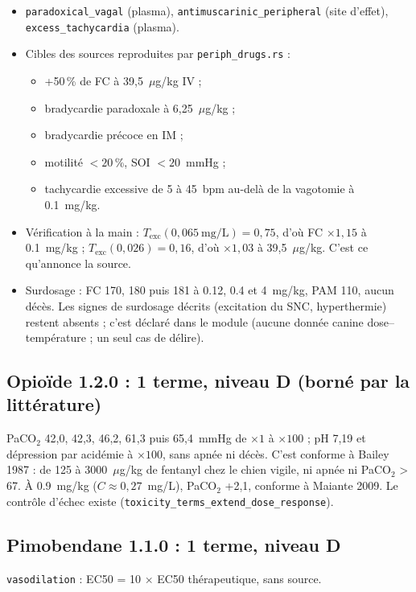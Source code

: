 \documentclass[10pt,a4paper]{article}
\newcommand{\cmd}[1]{\texttt{#1}}
\begin{document}
\begin{itemize}
\item \cmd{paradoxical\_vagal} (plasma), \cmd{antimuscarinic\_peripheral} (site d'effet), \cmd{excess\_tachycardia} (plasma).
\item Cibles des sources reproduites par \cmd{periph\_drugs.rs} :
  \begin{itemize}
  \item +50\,\% de FC à 39,5~$\mu$g/kg IV ;
  \item bradycardie paradoxale à 6,25~$\mu$g/kg ;
  \item bradycardie précoce en IM ;
  \item motilité $< 20$\,\%, SOI $< 20$~mmHg ;
  \item tachycardie excessive de 5 à 45~bpm au-delà de la vagotomie à \SI{0,1}{mg/kg}.
  \end{itemize}
\item Vérification à la main : $T_\text{exc}(0{,}065~\text{mg/L}) = 0{,}75$, d'où FC $\times 1{,}15$ à \SI{0,1}{mg/kg} ; $T_\text{exc}(0{,}026) = 0{,}16$, d'où $\times 1{,}03$ à 39,5~$\mu$g/kg. C'est ce qu'annonce la source.
\item Surdosage : FC 170, 180 puis 181 à \SI{0,12}{}, \SI{0,4}{} et \SI{4}{mg/kg}, PAM 110, aucun décès. Les signes de surdosage décrits (excitation du SNC, hyperthermie) restent absents ; c'est déclaré dans le module (aucune donnée canine dose–température ; un seul cas de délire).
\end{itemize}

\subsection*{Opioïde 1.2.0 : 1 terme, niveau D (borné par la littérature)}

PaCO$_2$ 42,0, 42,3, 46,2, 61,3 puis 65,4~mmHg de $\times 1$ à $\times 100$ ; pH 7,19 et dépression par acidémie à $\times 100$, sans apnée ni décès. C'est conforme à Bailey 1987 : de 125 à 3000~$\mu$g/kg de fentanyl chez le chien vigile, ni apnée ni PaCO$_2$ > 67. À \SI{0,9}{mg/kg} ($C \approx 0{,}27$~mg/L), PaCO$_2$ +2,1, conforme à Maiante 2009. Le contrôle d'échec existe (\cmd{toxicity\_terms\_extend\_dose\_response}).

\subsection*{Pimobendane 1.1.0 : 1 terme, niveau D}

\cmd{vasodilation} : EC50 = 10 $\times$ EC50 thérapeutique, sans source.
\end{document}

